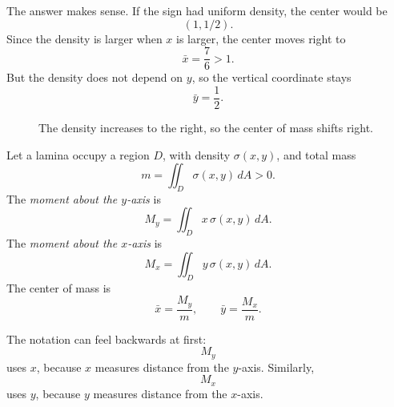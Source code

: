 The answer makes sense.  If the sign had uniform density, the center would be
\[
    (1,1/2).
\]
Since the density is larger when \(x\) is larger, the center moves right to
\[
    \bar x=\frac76>1.
\]
But the density does not depend on \(y\), so the vertical coordinate stays
\[
    \bar y=\frac12.
\]

\begin{figure}[h]
\centering
{}
\caption{The density increases to the right, so the center of mass shifts right.}
\end{figure}

\begin{definition}
Let a lamina occupy a region \(D\), with density \(\sigma(x,y)\), and total mass
\[
    m=\iint_D \sigma(x,y)\,dA>0.
\]
The \emph{moment about the \(y\)-axis} is
\[
\boxed{
    M_y=\iint_D x\,\sigma(x,y)\,dA.
}
\]
The \emph{moment about the \(x\)-axis} is
\[
\boxed{
    M_x=\iint_D y\,\sigma(x,y)\,dA.
}
\]
The center of mass is
\[
\boxed{
    \bar x=\frac{M_y}{m},
    \qquad
    \bar y=\frac{M_x}{m}.
}
\]
\end{definition}

The notation can feel backwards at first:
\[
    M_y
\]
uses \(x\), because \(x\) measures distance from the \(y\)-axis.  Similarly,
\[
    M_x
\]
uses \(y\), because \(y\) measures distance from the \(x\)-axis.

